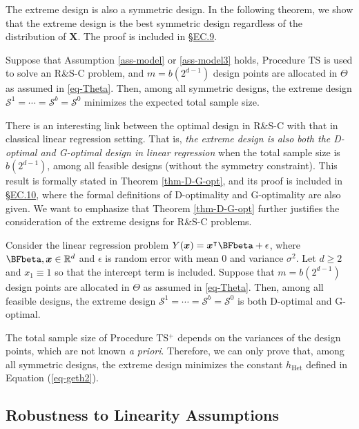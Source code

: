 \documentclass[ijoc,nonblindrev]{informs3}
\def\bx{{\bm x}}
\def\bX{{\bm X}}
\def\hhet{h_{\mathrm{Het}}}
\def\cS{{\mathcal{S}}}
\begin{document}
The extreme design is also a symmetric design.
In the following theorem, we show that the extreme design is the best symmetric design regardless of the distribution of $\bX$.
The proof is included in \S\hyperlink{EC.9}{EC.9}.

\begin{theorem} \label{thm-design}
Suppose that Assumption \ref{ass-model} or \ref{ass-model3} holds, Procedure TS is used to solve an R\&S-C problem, and $m = b(2^{d-1})$ design points are allocated in $\Theta$ as assumed in \eqref{eq-Theta}.
Then, among all symmetric designs, the extreme design $\cS^1=\cdots =\cS^b = \cS^0$ minimizes the expected total sample size.
\end{theorem}

There is an interesting link between the optimal design in R\&S-C with that in classical linear regression setting.
That is, \emph{the extreme design is also both the D-optimal and G-optimal design in linear regression} when the total sample size is $b(2^{d-1})$, among all feasible designs (without the symmetry constraint).
This result is formally stated in Theorem \ref{thm-D-G-opt}, and its proof is included in \S\hyperlink{EC.10}{EC.10}, where the formal definitions of D-optimality and G-optimality are also given.
We want to emphasize that Theorem \ref{thm-D-G-opt} further justifies the consideration of the extreme designs for R\&S-C problems.


\begin{theorem} \label{thm-D-G-opt}
Consider the linear regression problem $Y(\bx) = \bx^\intercal \BFbeta + \epsilon$, where $\BFbeta, \bx \in \mathbb{R}^{d}$ and $\epsilon$ is random error with mean 0 and variance $\sigma^2$.
Let $d\geq 2$ and $x_1 \equiv 1$ so that the intercept term is included.
Suppose that $m = b(2^{d-1})$ design points are allocated in $\Theta$ as assumed in \eqref{eq-Theta}.
Then, among all feasible designs, the extreme design $\cS^1=\cdots =\cS^b = \cS^0$ is both D-optimal and G-optimal.
\end{theorem}


\begin{remark}
The total sample size of Procedure TS$^+$ depends on the variances of the design points, which are not known \textit{a priori}.
Therefore, we can only prove that, among all symmetric designs, the extreme design minimizes the constant $\hhet$ defined in Equation (\ref{eq-geth2}).
\end{remark}


\subsection{Robustness to Linearity Assumptions} \label{subsec:robust}
\end{document}
